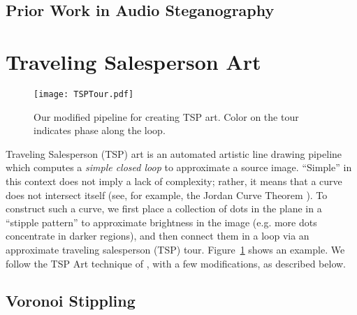 \documentclass[runningheads]{llncs}
\begin{document}
\subsection{Prior Work in Audio Steganography}

\section{Traveling Salesperson Art}

\begin{figure}
  \centering
  \texttt{[image: TSPTour.pdf]}
  \caption{Our modified pipeline for creating TSP art.  Color on the tour indicates phase along the loop.}
  \label{fig:TSPTour}
\end{figure}

Traveling Salesperson (TSP) art \cite{bosch2004continuous, kaplan2005tsp,bosch2008connecting} is an automated artistic line drawing pipeline which computes a {\em simple closed loop} to approximate a source image.  ``Simple'' in this context does not imply a lack of complexity; rather, it means that a curve does not intersect itself (see, for example, the Jordan Curve Theorem \cite{bosch2009jordan}).  To construct such a curve, we first place a collection of dots in the plane in a ``stipple pattern'' to approximate brightness in the image (e.g. more dots concentrate in darker regions), and then connect them in a loop via an approximate traveling salesperson (TSP) tour.  Figure~\ref{fig:TSPTour} shows an example.  We follow the TSP Art technique of \cite{kaplan2005tsp}, with a few modifications, as described below.


\subsection{Voronoi Stippling}
\label{sec:stippling}
\end{document}
